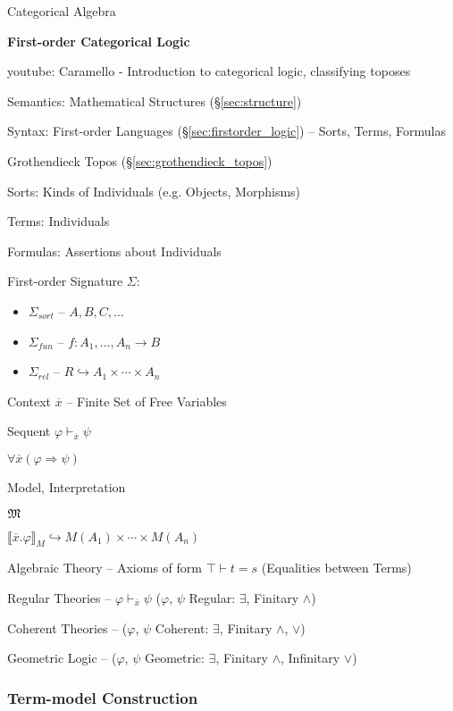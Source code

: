 Categorical Algebra


\textbf{First-order Categorical Logic}

youtube: Caramello - Introduction to categorical logic, classifying
toposes

Semantics: Mathematical Structures (\S\ref{sec:structure})

Syntax: First-order Languages (\S\ref{sec:firstorder_logic}) --
Sorts, Terms, Formulas

Grothendieck Topos (\S\ref{sec:grothendieck_topos})

Sorts: Kinds of Individuals (e.g. Objects, Morphisms) %

Terms: Individuals

Formulas: Assertions about Individuals


First-order Signature $\Sigma$:
\begin{itemize}
  \item $\Sigma_{sort}$ -- $A,B,C,\ldots$
  \item $\Sigma_{fun}$ -- $f : A_1, \ldots, A_n \rightarrow B$
  \item $\Sigma_{rel}$ -- $R \hookrightarrow A_1 \times \cdots \times
    A_n$
\end{itemize}

Context $\overline{x}$ -- Finite Set of Free Variables

Sequent $\varphi \vdash_{\overline{x}} \psi$

$\forall \overline{x} (\varphi \Rightarrow \psi)$

Model, Interpretation

$\mathfrak{M}$

$\llbracket \overline{x}.\varphi \rrbracket_M \hookrightarrow M(A_1)
\times \cdots \times M(A_n)$


Algebraic Theory -- Axioms of form $\top \vdash t = s$ (Equalities
between Terms)

Regular Theories -- $\varphi \vdash_{\overline{x}} \psi$ ($\varphi$,
$\psi$ Regular: $\exists$, Finitary $\wedge$)

Coherent Theories -- ($\varphi$, $\psi$ Coherent: $\exists$, Finitary
$\wedge$, $\vee$)

Geometric Logic -- ($\varphi$, $\psi$ Geometric: $\exists$, Finitary
$\wedge$, Infinitary $\vee$)




\subsubsection{Term-model Construction}\label{sec:term_model}

